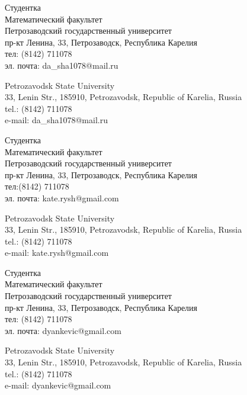 \documentclass{article}
\begin{document}
\begin{aboutauthors}
Студентка\\ 
Математический факультет\\ 
Петрозаводский государственный университет\\
пр-кт Ленина, 33, Петрозаводск, Республика Карелия\\
тел: (8142) 711078\\
эл. почта: da\_sha1078@mail.ru

\columnbreak

Petrozavodsk State University\\
33, Lenin Str., 185910, Petrozavodsk, Republic of Karelia, Russia\\
tel.: (8142) 711078\\
e-mail: da\_sha1078@mail.ru
\end{aboutauthors}

\begin{aboutauthors}
Студентка\\ 
Математический факультет\\ 
Петрозаводский государственный университет\\
пр-кт Ленина, 33, Петрозаводск, Республика Карелия\\
тел:(8142) 711078\\
эл. почта: kate.rysh@gmail.com

\columnbreak

Petrozavodsk State University\\
33, Lenin Str., 185910, Petrozavodsk, Republic of Karelia, Russia\\
tel.: (8142) 711078\\
e-mail: kate.rysh@gmail.com 
\end{aboutauthors}

\begin{aboutauthors}
Студентка\\ 
Математический факультет\\ 
Петрозаводский государственный университет\\
пр-кт Ленина, 33, Петрозаводск, Республика Карелия\\
тел: (8142) 711078\\
эл. почта: dyankevic@gmail.com

\columnbreak

Petrozavodsk State University\\
33, Lenin Str., 185910, Petrozavodsk, Republic of Karelia, Russia\\
tel.: (8142) 711078\\
e-mail: dyankevic@gmail.com
\end{aboutauthors}
\end{document}
